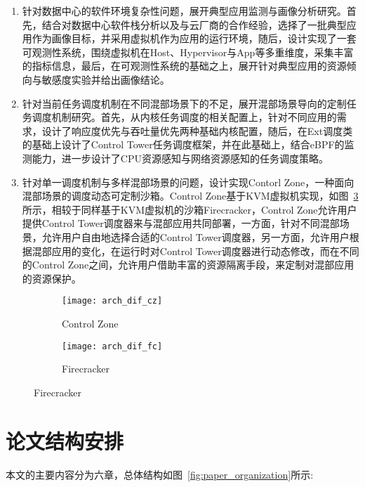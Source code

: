 \begin{enumerate}
    \item 针对数据中心的软件环境复杂性问题，展开典型应用监测与画像分析研究。首先，结合对数据中心软件栈分析以及与云厂商的合作经验，选择了一批典型应用作为画像目标，并采用虚拟机作为应用的运行环境，随后，设计实现了一套可观测性系统，围绕虚拟机在Host、Hypervisor与App等多重维度，采集丰富的指标信息，最后，在可观测性系统的基础之上，展开针对典型应用的资源倾向与敏感度实验并给出画像结论。
    \item 针对当前任务调度机制在不同混部场景下的不足，展开混部场景导向的定制任务调度机制研究。首先，从内核任务调度的相关配置上，针对不同应用的需求，设计了响应度优先与吞吐量优先两种基础内核配置，随后，在Ext调度类的基础上设计了Control Tower任务调度框架，并在此基础上，结合eBPF的监测能力，进一步设计了CPU资源感知与网络资源感知的任务调度策略。
    \item 针对单一调度机制与多样混部场景的问题，设计实现Contorl Zone，一种面向混部场景的调度动态可定制沙箱。Control Zone基于KVM虚拟机实现，如图~\ref{fig:arch_dif}所示，相较于同样基于KVM虚拟机的沙箱Firecracker，Control Zone允许用户提供Control Tower调度器来与混部应用共同部署，一方面，针对不同混部场景，允许用户自由地选择合适的Control Tower调度器，另一方面，允许用户根据混部应用的变化，在运行时对Control Tower调度器进行动态修改，而在不同的Control Zone之间，允许用户借助丰富的资源隔离手段，来定制对混部应用的资源保护。
\end{enumerate}

\begin{figure}[!htbp]
    \centering
    \begin{subfigure}[b]{0.45\textwidth}
        \texttt{[image: arch\_dif\_cz]}
        \caption{Control Zone}
        \label{fig:arch_dif_cz}
    \end{subfigure}
    \hfill
    \begin{subfigure}[b]{0.45\textwidth}
        \texttt{[image: arch\_dif\_fc]}
        \caption{Firecracker}
        \label{fig:arch_dif_fc}
    \end{subfigure}
\label{fig:arch_dif}
\end{figure}

\section{论文结构安排}

本文的主要内容分为六章，总体结构如图~\ref{fig:paper_organization}所示:

